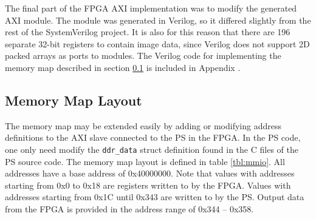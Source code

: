 The final part of the FPGA AXI implementation was to modify the generated AXI module. The module was generated in Verilog, so it differed slightly from the rest of the SystemVerilog project. It is also for this reason that there are 196 separate 32-bit registers to contain image data, since Verilog does not support 2D packed arrays as ports to modules. The Verilog code for implementing the memory map described in section \ref{mmio-lay} is included in Appendix .

\subsection{Memory Map Layout}\label{mmio-lay}
The memory map may be extended easily by adding or modifying address definitions to the AXI slave connected to the PS in the FPGA. In the PS code, one only need modify the \texttt{ddr\_data} struct definition found in the C files of the PS source code. The memory map layout is defined in table \ref{tbl:mmio}. All addresses have a base address of 0x40000000. Note that values with addresses starting from 0x0 to 0x18 are registers written to by the FPGA. Values with addresses starting from 0x1C until 0x343 are written to by the PS. Output data from the FPGA is provided in the address range of 0x344 -- 0x358.
